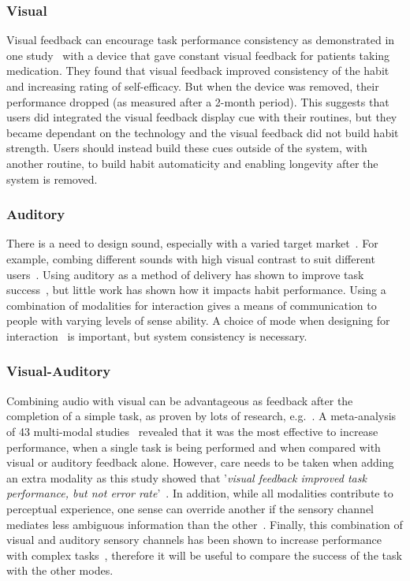 \documentclass{scaffold/sigchi}
\begin{document}
\subsubsection{Visual}
Visual feedback can encourage task performance consistency as demonstrated in one study~\cite{article_realtime_feedback_improving_medication_taking} with a device that gave constant visual feedback for patients taking medication. They found that visual feedback improved consistency of the habit and increasing rating of self-efficacy. But when the device was removed, their performance dropped (as measured after a 2-month period). This suggests that users did integrated the visual feedback display cue with their routines, but they became dependant on the technology and the visual feedback did not build habit strength. Users should instead build these cues outside of the system, with another routine, to build habit automaticity and enabling longevity after the system is removed.

\subsubsection{Auditory}
There is a need to design sound, especially with a varied target market~\cite{article_designing_for_health_behaviour_change_hci}. For example, combing different sounds with high visual contrast to suit different users~\cite{article_movipill_improving_medication_elders}. Using auditory as a method of delivery has shown to improve task success~\cite{auditory_notifications_increase_delivery_success}, but little work has shown how it impacts habit performance. Using a combination of modalities for interaction gives a means of communication to people with varying levels of sense ability. A choice of mode when designing for interaction~\cite{article_user_centred_multimodal_reminders} is important, but system consistency is necessary.

\subsubsection{Visual-Auditory}
Combining audio with visual can be advantageous as feedback after the completion of a simple task, as proven by lots of research, e.g.~\cite{benefits_of_audio_visual_1, benefits_of_audio_visual_2}. A meta-analysis of 43 multi-modal studies~\cite{comparing_modalities_effects_of_visual_auditory} revealed that it was the most effective to increase performance, when a single task is being performed and when compared with visual or auditory feedback alone. However, care needs to be taken when adding an extra modality as this study showed that '\textit{visual feedback improved task performance, but not error rate}'~\cite{comparing_modalities_effects_of_visual_auditory}. In addition, while all modalities contribute to perceptual experience, one sense can override another if the sensory channel mediates less ambiguous information than the other~\cite{one_mode_override_another}. Finally, this combination of visual and auditory sensory channels has been shown to increase performance with complex tasks~\cite{chi_oussama_tap_the_shapetones}, therefore it will be useful to compare the success of the task with the other modes.
\end{document}
